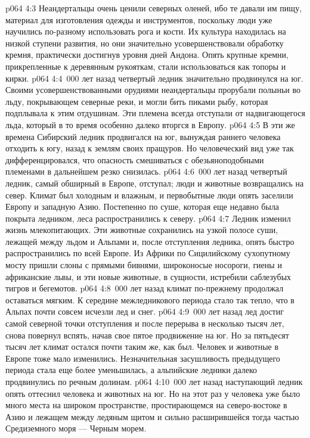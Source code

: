 \vs p064 4:3 Неандертальцы очень ценили северных оленей, ибо те давали им пищу, материал для изготовления одежды и инструментов, поскольку люди уже научились по\hyp{}разному использовать рога и кости. Их культура находилась на низкой ступени развития, но они значительно усовершенствовали обработку кремня, практически достигнув уровня дней Андона. Опять крупные кремни, прикрепленные к деревянным рукояткам, стали использоваться как топоры и кирки.
\vs p064 4:4 \,000 лет назад четвертый ледник значительно продвинулся на юг. Своими усовершенствованными орудиями неандертальцы прорубали полыньи во льду, покрывающем северные реки, и могли бить пиками рыбу, которая подплывала к этим отдушинам. Эти племена всегда отступали от надвигающегося льда, который в то время особенно далеко вторгся в Европу.
\vs p064 4:5 В эти же времена Сибирский ледник продвигался на юг, вынуждая раннего человека отходить к югу, назад к землям своих пращуров. Но человеческий вид уже так дифференцировался, что опасность смешиваться с обезьяноподобными племенами в дальнейшем резко снизилась.
\vs p064 4:6 \,000 лет назад четвертый ледник, самый обширный в Европе, отступал; люди и животные возвращались на север. Климат был холодным и влажным, и первобытные люди опять заселили Европу и западную Азию. Постепенно по суше, которая еще недавно была покрыта ледником, леса распространились к северу.
\vs p064 4:7 Ледник изменил жизнь млекопитающих. Эти животные сохранились на узкой полосе суши, лежащей между льдом и Альпами и, после отступления ледника, опять быстро распространились по всей Европе. Из Африки по Сицилийскому сухопутному мосту пришли слоны с прямыми бивнями, широконосые носороги, гиены и африканские львы, и эти новые животные, в сущности, истребили саблезубых тигров и бегемотов.
\vs p064 4:8 \,000 лет назад климат по\hyp{}прежнему продолжал оставаться мягким. К середине межледникового периода стало так тепло, что в Альпах почти совсем исчезли лед и снег.
\vs p064 4:9 \,000 лет назад лед достиг самой северной точки отступления и после перерыва в несколько тысяч лет, снова повернул вспять, начав свое пятое продвижение на юг. Но за пятьдесят тысяч лет климат остался почти таким же, как был. Человек и животные в Европе тоже мало изменились. Незначительная засушливость предыдущего периода стала еще более уменьшилась, а альпийские ледники далеко продвинулись по речным долинам.
\vs p064 4:10 \,000 лет назад наступающий ледник опять оттеснил человека и животных на юг. Но на этот раз у человека уже было много места на широком пространстве, простирающемся на северо\hyp{}востоке в Азию и лежащем между ледяным щитом и сильно расширившейся тогда частью Средиземного моря --- Черным морем.
